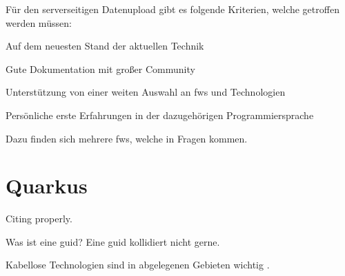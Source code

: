 Für den serverseitigen Datenupload gibt es folgende Kriterien, welche getroffen werden müssen:
\begin{compactitem}
    \item Auf dem neuesten Stand der aktuellen Technik
    \item Gute Dokumentation mit großer Community
    \item Unterstützung von einer weiten Auswahl an \glspl{fw} und Technologien
    \item Persönliche erste Erfahrungen in der dazugehörigen Programmiersprache
\end{compactitem}

Dazu finden sich mehrere \glspl{fw}, welche in Fragen kommen.




\section{Quarkus}







 Citing \cite{InfH} properly.

Was ist eine \gls{guid}?
Eine \gls{guid} kollidiert nicht gerne.

Kabellose Technologien sind in abgelegenen Gebieten wichtig \cite{APCW2006}.

